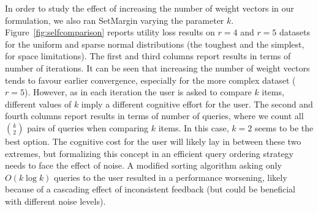 \documentclass{article}
\renewcommand\[{\begin{equation}}
\renewcommand\]{\end{equation}}
\newcommand{\vecvar}[1]{\ensuremath{\boldsymbol{#1}}}
\newcommand{\vx}{\vecvar{x}}
\newcommand{\stefano}[1]{{\bf \textcolor{green}{{\fbox{Stefano:} #1}}}}
\begin{document}
In order to study the effect of increasing the number of weight
vectors in our formulation, we also ran {\sc SetMargin} varying the
parameter $k$. Figure~\ref{fig:selfcomparison} reports utility loss
results on $r=4$ and $r=5$ datasets for the uniform and sparse normal
distributions (the toughest and the simplest, for space limitations).
The first and third columns report results in terms of number of
iterations. It can be seen that increasing the number of weight
vectors tends to favour earlier convergence, especially for the more
complex dataset ($r=5$). However, as in each iteration the user is
asked to compare $k$ items, different values of $k$ imply a different
cognitive effort for the user. The second and fourth columns report
results in terms of number of queries, where we count all
$k \choose 2$ pairs of queries when comparing $k$ items. In this case,
$k=2$ seems to be the best option. The cognitive cost for the user
will likely lay in between these two extremes, but formalizing this
concept in an efficient query ordering strategy needs to face the
effect of noise.  A modified sorting algorithm asking only
$O(k\log k)$ queries to the user resulted in a performance worsening,
likely because of a cascading effect of inconsistent feedback (but
could be beneficial with different noise levels).


\end{document}
